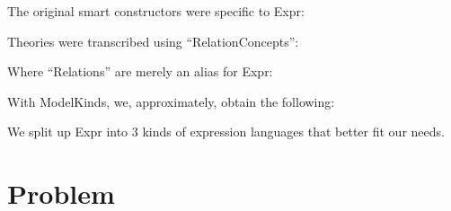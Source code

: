 The original smart constructors were specific to Expr:

\originalFewExprSmartConstructorsHaskell

Theories were transcribed using ``RelationConcepts'':

\originalRelationConcept

Where ``Relations'' are merely an alias for Expr:

\originalRelation{}

\theoriesWithoutModelKinds

With ModelKinds, we, approximately, obtain the following:

\theoriesWithModelKinds

We split up Expr into 3 kinds of expression languages that better fit our needs.

\section{Problem}

